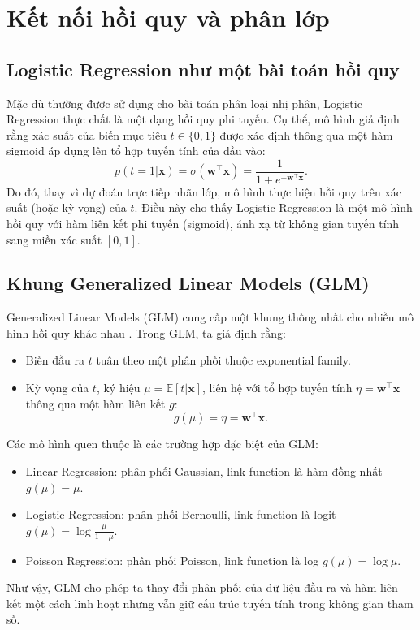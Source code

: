 \section{Kết nối hồi quy và phân lớp}
\subsection{Logistic Regression như một bài toán hồi quy}
Mặc dù thường được sử dụng cho bài toán phân loại nhị phân, Logistic
Regression thực chất là một dạng hồi quy phi tuyến. Cụ thể, mô hình giả định
rằng xác suất của biến mục tiêu $t \in \{0,1\}$ được xác định thông qua một
hàm sigmoid áp dụng lên tổ hợp tuyến tính của đầu vào:
\begin{equation}
p(t=1|\boldsymbol{x}) = \sigma(\boldsymbol{w}^\intercal \boldsymbol{x}) =
\frac {1}{1 + e^{-\boldsymbol{w}^\intercal \boldsymbol{x}}}.
\end{equation}
Do đó, thay vì dự đoán trực tiếp nhãn lớp, mô hình thực hiện hồi quy trên xác
suất (hoặc kỳ vọng) của $t$. Điều này cho thấy Logistic Regression là một mô
hình hồi quy với hàm liên kết phi tuyến (sigmoid), ánh xạ từ không gian tuyến
tính sang miền xác suất $[0,1]$.

\subsection{Khung Generalized Linear Models (GLM)}
Generalized Linear Models (GLM) cung cấp một khung thống nhất cho nhiều mô
hình hồi quy khác nhau \cite[Chap.~12]{pml1Book}. Trong GLM, ta giả định rằng:
\begin{itemize}
    \item Biến đầu ra $t$ tuân theo một phân phối thuộc exponential family.
    \item Kỳ vọng của $t$, ký hiệu $\mu = \mathbb{E}[t|\boldsymbol{x}]$, liên
    hệ với tổ hợp tuyến tính $\eta = \boldsymbol{w}^\intercal \boldsymbol{x}$
    thông qua một hàm liên kết $g$:
    \begin{equation}
    g(\mu) = \eta = \boldsymbol{w}^\intercal \boldsymbol{x}.
    \end{equation}
\end{itemize}
Các mô hình quen thuộc là các trường hợp đặc biệt của GLM:
\begin{itemize}
    \item Linear Regression: phân phối Gaussian, link function là hàm đồng
    nhất $g(\mu) = \mu$.
    \item Logistic Regression: phân phối Bernoulli, link function là logit $g
    (\mu) = \log \frac{\mu}{1-\mu}$.
    \item Poisson Regression: phân phối Poisson, link function là log $g(\mu)
    = \log \mu$.
\end{itemize}
Như vậy, GLM cho phép ta thay đổi phân phối của dữ liệu đầu ra và hàm liên kết
một cách linh hoạt nhưng vẫn giữ cấu trúc tuyến tính trong không gian tham số.

